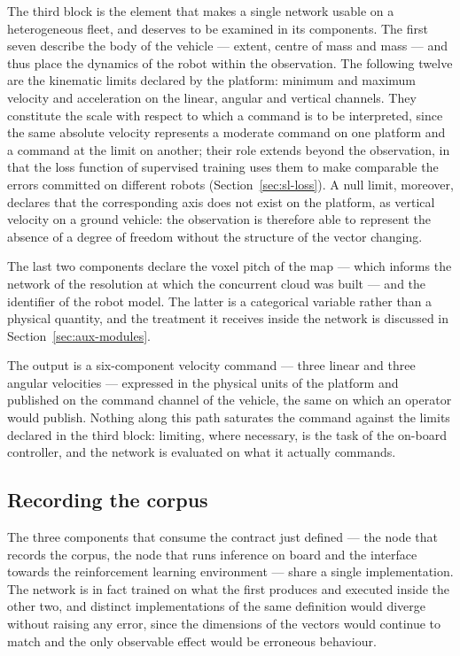 The third block is the element that makes a single network usable on a
heterogeneous fleet, and deserves to be examined in its components. The first
seven describe the body of the vehicle --- extent, centre of mass and mass ---
and thus place the dynamics of the robot within the observation. The following
twelve are the kinematic limits declared by the platform: minimum and maximum
velocity and acceleration on the linear, angular and vertical channels. They
constitute the scale with respect to which a command is to be interpreted, since
the same absolute velocity represents a moderate command on one platform and a
command at the limit on another; their role extends beyond the observation, in
that the loss function of supervised training uses them to make comparable the
errors committed on different robots (Section~\ref{sec:sl-loss}). A null limit,
moreover, declares that the corresponding axis does not exist on the platform,
as vertical velocity on a ground vehicle: the observation is therefore able to
represent the absence of a degree of freedom without the structure of the vector
changing.

The last two components declare the voxel pitch of the map --- which informs the
network of the resolution at which the concurrent cloud was built --- and the
identifier of the robot model. The latter is a categorical variable rather than
a physical quantity, and the treatment it receives inside the network is
discussed in Section~\ref{sec:aux-modules}.

The output is a six-component velocity command --- three linear and three
angular velocities --- expressed in the physical units of the platform and
published on the command channel of the vehicle, the same on which an operator
would publish. Nothing along this path saturates the command against the limits
declared in the third block: limiting, where necessary, is the task of the
on-board controller, and the network is evaluated on what it actually commands.

\subsection{Recording the corpus}
\label{sec:observation-recording}

The three components that consume the contract just defined --- the node that
records the corpus, the node that runs inference on board and the interface
towards the reinforcement learning environment --- share a single
implementation. The network is in fact trained on what the first produces and
executed inside the other two, and distinct implementations of the same
definition would diverge without raising any error, since the dimensions of the
vectors would continue to match and the only observable effect would be
erroneous behaviour.

